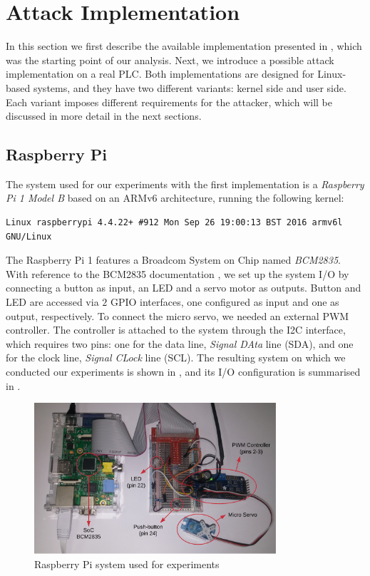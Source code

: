 \section{Attack Implementation}
\label{sec:attack_impl}

In this section we first describe the available implementation presented in \cite{ghostplc}, which was the starting point of our analysis.
Next, we introduce a possible attack implementation on a real PLC. Both implementations are designed for Linux-based systems, and they have two different
variants: kernel side and user side. Each variant imposes different requirements for the attacker, which will be discussed in more detail in the next sections.


\subsection{Raspberry Pi}
\label{sec:attack_pi}

The system used for our experiments with the first implementation is a \emph{Raspberry Pi 1 Model B} based on an ARMv6 architecture, running the following kernel:
\begin{Verbatim}[fontsize=\small]
	Linux raspberrypi 4.4.22+ #912 Mon Sep 26 19:00:13 BST 2016 armv6l GNU/Linux
\end{Verbatim}
The Raspberry Pi 1 features a Broadcom System on Chip named \emph{BCM2835}. With reference to the BCM2835 documentation \cite{bcm2835},
we set up the system I/O by connecting a button as input, an LED and a servo motor as outputs. Button and LED are accessed via $2$ GPIO interfaces,
one configured as input and one as output, respectively. To connect the micro servo, we needed an external PWM controller. The controller is attached to the system
through the I2C interface, which requires two pins: one for the data line, \emph{Signal DAta} line (SDA), and one for the clock line, \emph{Signal CLock} line (SCL).
The resulting system on which we conducted our experiments is shown in , and its I/O configuration is summarised in .

\begin{figure}[h]
\centerline{\includegraphics[width=0.8\textwidth]{res/pi_system}}
\caption{Raspberry Pi system used for experiments \label{fig:pi_system}}
\end{figure}

